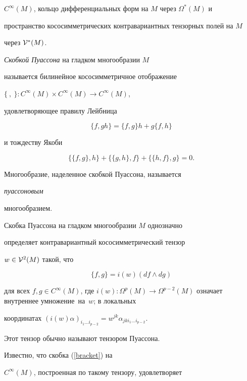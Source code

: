 $C^\infty(M)$, кольцо дифференциальных форм на $M$ через $\Omega^*(M)$ и


пространство кососимметрических контравариантных тензорных полей на $M$


через ${\cal V}^*(M)$.





{\it Скобкой Пуассона} на гладком многообразии $M$


называется билинейное кососимметричное отображение


$\{\ ,\ \}:C^\infty(M)\times C^\infty(M)\to C^\infty(M)$,


удовлетворяющее правилу Лейбница


$$


\{f, gh\}=\{f,g\}h+g\{f,h\}


$$


и тождеству Якоби


$$


\{\{f,g\},h\} +   \{\{g,h\},f\} +    \{\{h,f\},g\} = 0.


$$





Многообразие, наделенное скобкой Пуассона, называется {\it пуассоновым


многообразием.}


Скобка Пуассона на гладком многообразии $M$ однозначно


определяет контравариантный кососимметрический тензор


$w\in {\cal V}^2(M)$ такой, что


\begin{equation}


\label{bracket}


\{f,g\}=i(w)(df\wedge dg)


\end{equation}


для всех $f,g\in C^\infty(M)$, где $i(w):\Omega^p(M)\to


\Omega^{p-2}(M)$ означает внутреннее умножение~на~$w$; в локальных


координатах $(i(w)\alpha)_{i_1\dotsc i_{p-2}}=


w^{jk}\alpha_{jki_1\dotsc i_{p-2}}$.


Этот тензор обычно называют тензором Пуассона.


Известно, что скобка (\ref{bracket}) на


$C^\infty(M)$, построенная по такому тензору, удовлетворяет


